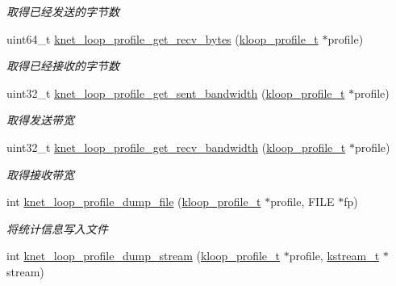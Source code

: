 \begin{DoxyCompactItemize}
\begin{DoxyCompactList}\small\item\em 取得已经发送的字节数 \end{DoxyCompactList}\item 
uint64\+\_\+t \hyperlink{a00097_a1ac76d26570c5973ca054d5d2be07596_a1ac76d26570c5973ca054d5d2be07596}{knet\+\_\+loop\+\_\+profile\+\_\+get\+\_\+recv\+\_\+bytes} (\hyperlink{a00066_ab75a5c23099a6118c469ed160b277f28_ab75a5c23099a6118c469ed160b277f28}{kloop\+\_\+profile\+\_\+t} $\ast$profile)
\begin{DoxyCompactList}\small\item\em 取得已经接收的字节数 \end{DoxyCompactList}\item 
uint32\+\_\+t \hyperlink{a00097_a61bab9d3f25b772c11067d7ad48e5591_a61bab9d3f25b772c11067d7ad48e5591}{knet\+\_\+loop\+\_\+profile\+\_\+get\+\_\+sent\+\_\+bandwidth} (\hyperlink{a00066_ab75a5c23099a6118c469ed160b277f28_ab75a5c23099a6118c469ed160b277f28}{kloop\+\_\+profile\+\_\+t} $\ast$profile)
\begin{DoxyCompactList}\small\item\em 取得发送带宽 \end{DoxyCompactList}\item 
uint32\+\_\+t \hyperlink{a00097_a925853b256684e4d935f28d4c73a4832_a925853b256684e4d935f28d4c73a4832}{knet\+\_\+loop\+\_\+profile\+\_\+get\+\_\+recv\+\_\+bandwidth} (\hyperlink{a00066_ab75a5c23099a6118c469ed160b277f28_ab75a5c23099a6118c469ed160b277f28}{kloop\+\_\+profile\+\_\+t} $\ast$profile)
\begin{DoxyCompactList}\small\item\em 取得接收带宽 \end{DoxyCompactList}\item 
int \hyperlink{a00097_ada601f1836bdb78ccd50be447559a101_ada601f1836bdb78ccd50be447559a101}{knet\+\_\+loop\+\_\+profile\+\_\+dump\+\_\+file} (\hyperlink{a00066_ab75a5c23099a6118c469ed160b277f28_ab75a5c23099a6118c469ed160b277f28}{kloop\+\_\+profile\+\_\+t} $\ast$profile, F\+I\+L\+E $\ast$fp)
\begin{DoxyCompactList}\small\item\em 将统计信息写入文件 \end{DoxyCompactList}\item 
int \hyperlink{a00097_a256be2a18ebf141d93f95cdce1975a9e_a256be2a18ebf141d93f95cdce1975a9e}{knet\+\_\+loop\+\_\+profile\+\_\+dump\+\_\+stream} (\hyperlink{a00066_ab75a5c23099a6118c469ed160b277f28_ab75a5c23099a6118c469ed160b277f28}{kloop\+\_\+profile\+\_\+t} $\ast$profile, \hyperlink{a00066_acc208c4c40c875eebbfef88f00fffacf_acc208c4c40c875eebbfef88f00fffacf}{kstream\+\_\+t} $\ast$stream)

\end{DoxyCompactItemize}
